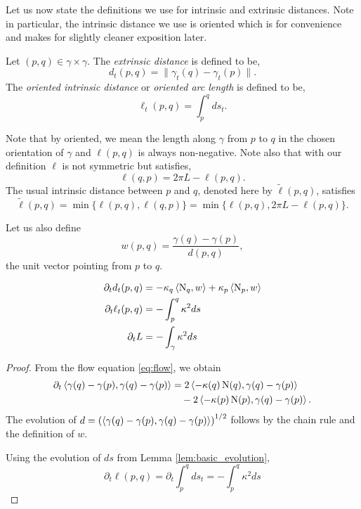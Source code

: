 \documentclass[a4paper, 12pt]{amsart}
\begin{document}
Let us now state the definitions we use for intrinsic and extrinsic distances. Note in particular, the intrinsic distance we use is oriented which is for convenience and makes for slightly cleaner exposition later.

\begin{defn}
\label{defn:dist}
Let \((p,q) \in \gamma \times \gamma\). The \emph{extrinsic distance} is defined to be,
\[
d_t(p, q) = \|\gamma_t(q) - \gamma_t(p)\|.
\]
The \emph{oriented intrinsic distance} or \emph{oriented arc length} is defined to be,
\[
\ell_t(p, q) = \int_p^q ds_t.
\]
\end{defn}

Note that by oriented, we mean the length along \(\gamma\) from \(p\) to \(q\) in the chosen orientation of \(\gamma\) and \(\ell(p, q)\) is always non-negative. Note also that with our definition \(\ell\) is not symmetric but satisfies,
\begin{equation}
\label{eq:ell_symmetry}
\ell(q, p) = 2\pi L - \ell(p, q).
\end{equation}
The usual intrinsic distance between \(p\) and \(q\), denoted here by \(\tilde{\ell}(p, q)\), satisfies
\[
\tilde{\ell}(p, q) = \min\{\ell(p, q), \ell(q, p)\} = \min\{\ell(p, q), 2\pi L - \ell(p, q)\}.
\]

Let us also define
\begin{equation}
\label{eq:w}
w(p, q) = \frac{\gamma(q) - \gamma(p)}{d(p,q)},
\end{equation}
the unit vector pointing from \(p\) to \(q\).

\begin{lemma}
\label{lem:distance_evolution}

\begin{align*}
\partial_t d_t(p, q) &= -\kappa_q \left\langle \operatorname{N}_q,w \right\rangle + \kappa_p \left\langle \operatorname{N}_p,w \right\rangle \\
\partial_t \ell_t(p, q) &= - \int_p^q \kappa^2 ds \\
\partial_t L &= - \int_{\gamma} \kappa^2 ds
\end{align*}
\end{lemma}

\begin{proof}
From the flow equation \eqref{eq:flow}, we obtain
\[
\begin{split}
\partial_t \left\langle \gamma(q) - \gamma(p),\gamma(q) - \gamma(p) \right\rangle &= 2 \left\langle -\kappa(q) \operatorname{N}(q),\gamma(q) - \gamma(p) \right\rangle \\
&\quad  - 2 \left\langle -\kappa(p) \operatorname{N}(p),\gamma(q) - \gamma(p) \right\rangle.
\end{split}
\]
The evolution of \(d = \left(\left\langle \gamma(q) - \gamma(p),\gamma(q) - \gamma(p) \right\rangle\right)^{1/2}\) follows by the chain rule and the definition of \(w\).

Using the evolution of \(ds\) from Lemma \ref{lem:basic_evolution},
\[
\partial_t \ell(p,q) = \partial_t \int_p^q ds_t = -\int_p^q \kappa^2 ds
\]
\end{proof}
\end{document}
